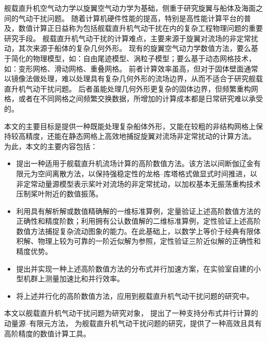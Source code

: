 
\begin{cabstract}
舰载直升机空气动力学以旋翼空气动力学为基础，侧重于研究旋翼与船体及海面之间的气动干扰问题。
随着计算机硬件性能的提高，特别是高性能计算平台的普及，数值计算正日益称为包括舰载直升机气动干扰在内的复杂工程物理问题的重要研究手段。
舰载直升机气动干扰的计算难点，主要来源于旋翼对流场的非定常扰动，其次来源于船体的复杂几何外形。
现有的旋翼空气动力学数值方法，要么基于简化的物理模型，如：自由尾迹模型、涡粒子模型；要么基于动态网格技术，如：变形网格、滑动网格、重叠网格。
前者计算效率虽高，但对于固体壁面通常以镜像法做处理，难以处理具有复杂几何外形的流场边界，从而不适合于研究舰载直升机气动干扰问题。
后者虽能处理几何外形更复杂的固体边界，但频繁重构网格，或者在不同网格之间频繁交换数据，所增加的计算成本都是日常研究难以承受的。

本文的主要目标是提供一种既能处理复杂船体外形，又能在较粗的非结构网格上保持较高精度，还能在静态网格上高效地捕捉旋翼对流场非定常扰动的计算方法。
为此，本文的主要内容包括：
\begin{itemize}[wide]
\item 提出一种适用于舰载直升机流场计算的高阶数值方法。该方法以间断伽辽金有限元为空间离散方法，以保持强稳定性的龙格--库塔格式做显式时间推进，以非定常动量源模型表示桨叶对流场的非定常扰动，以加权基本无振荡重构技术压制桨叶附近的数值振荡。
\item 利用具有解析解或数值精确解的一维标准算例，定量验证上述高阶数值方法的正确性和精度阶数；利用拥有公认数值解的二维标准算例，定性验证上述高阶数值方法捕捉复杂流动图象的能力。在此基础上，以数学上等价于经典有限体积解、物理上较为可靠的一阶近似解为参照，定性验证三阶近似解的正确性和精度优势。
\item 提出并实现一种上述高阶数值方法的分布式并行加速方案，在实验室自建的小型机群上测量加速比和并行效率。
\item 将上述并行化的高阶数值方法，应用到舰载直升机气动干扰问题的研究中。
\end{itemize}

本文以舰载直升机气动干扰问题为研究对象，
提出了一种支持分布式并行计算的动量源--有限元方法，
为舰载直升机气动干扰问题的研究，提供了一种高效且具有高阶精度的数值计算工具。
\end{cabstract}


